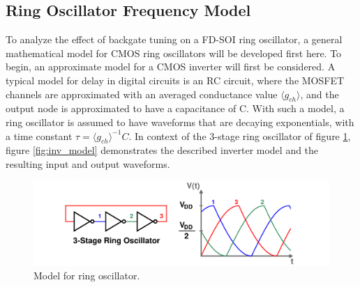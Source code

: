 
	\FloatBarrier








	\subsection{Ring Oscillator Frequency Model}\label{eq:freq_deriv}
		To analyze the effect of backgate tuning on a FD-SOI ring oscillator, a general mathematical model for CMOS ring oscillators will be developed first here. To begin, an approximate model for a CMOS inverter will first be considered. A typical model for delay in digital circuits is an RC circuit, where the MOSFET channels are approximated with an averaged conductance value $\langle g_{ch} \rangle$, and the output node is approximated to have a capacitance of C. With such a model, a ring oscillator is assumed to have waveforms that are decaying exponentials, with a time constant $\tau = \langle g_{ch} \rangle^{-1}C$. In context of the 3-stage ring oscillator of figure \ref{fig:rosc_rc}, figure \ref{fig:inv_model} demonstrates the described inverter model and the resulting input and output waveforms.

		\begin{figure}[htb!]
			\center\includegraphics[width=0.8\linewidth, angle=0]{figs/theory/osc_waves}
			\caption{Model for ring oscillator.}
			\label{fig:rosc_rc}
		\end{figure}

